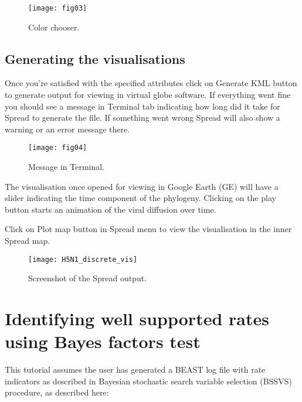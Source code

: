 \begin{figure}[H]
\begin{centering}
\texttt{[image: fig03]}
\caption{Color chooser.}
\label{fig:03}
\par\end{centering}
\end{figure}


\subsection{Generating the visualisations}

Once you're satisfied with the specified attributes click on Generate
KML button to generate output for viewing in virtual globe software.
If everything went fine you should see a message in Terminal tab indicating
how long did it take for Spread to generate the file. If something
went wrong Spread will also show a warning or an error message there.


\begin{figure}[H]
\begin{centering}
\texttt{[image: fig04]}
\caption{Message in Terminal.}
\label{fig:04}
\par\end{centering}
\end{figure}

The visualisation once opened for viewing in Google Earth (GE) will
have a slider indicating the time component of the phylogeny. Clicking
on the play button starts an animation of the viral diffusion over
time. 

Click on Plot map button in Spread menu to view the visualisation
in the inner Spread map. 


\begin{figure}[H]
\begin{centering}
\texttt{[image: H5N1\_discrete\_vis]}
\caption{Screenshot of the Spread output.}
\label{fig:05}
\par\end{centering}
\end{figure}

\section{Identifying well supported rates using Bayes factors test}

This tutorial assumes the user has generated a BEAST log file with
rate indicators as described in Bayesian stochastic search variable
selection (BSSVS) procedure, as described here:


